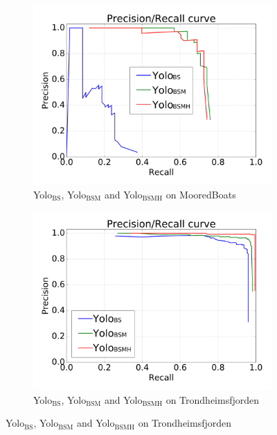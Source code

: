 \begin{figure}[h!]
\captionsetup[subfigure]{justification=centering}
\begin{subfigure}{.5\textwidth}
  \centering
  \includegraphics[width=0.8\linewidth]{results/case_tr_moor/prec_recall/bb-eps2.png}
  \caption{Yolo$_{\text{BS}}$, Yolo$_{\text{BSM}}$ and Yolo$_{\text{BSMH}}$ on MooredBoats}
  \label{fig:moor_bb}
\end{subfigure}%
\begin{subfigure}{.5\textwidth}
  \centering
  \includegraphics[width=.8\linewidth]{results/case_tr_moor/prec_recall/trf-eps2.png}
  \caption{Yolo$_{\text{BS}}$, Yolo$_{\text{BSM}}$ and Yolo$_{\text{BSMH}}$  on Trondheimsfjorden}
  \label{fig:moor_trf}
\end{subfigure}


\end{figure}
